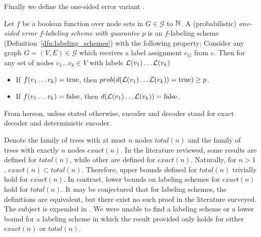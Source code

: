 Finally we define the one-sided error variant  \cite{fraigniaud2009}.

			\begin{definition}\label{dfn:one-sided}
				Let  $f$ be a boolean function over node sets  in  $G \in \mathcal{G}$ to $ \mathbb{N}$.
				 A (probabilistic) \emph{one-sided error $f$-labeling scheme  with guarantee $p$} is an $f$-labeling scheme (Definition~\ref{dfn:labeling_schemes})  with the following property:
				 Consider any graph $G=(V,E) \in \mathcal{G}$ which receives a label assignment $e_G$ from $e$. Then for any set of nodes $v_1\dots v_k\in V$ with labels  $ \mathcal{L}(v_1)\dots  \mathcal{L}(v_k) $
				 \begin{itemize}
				 	\item  If  $f(v_1\dots v_k) =  \mathrm{true} $,  then   $prob(d( \mathcal{L}(v_1)\dots  \mathcal{L}(v_k)) =  \mathrm{true}) \geq p$. 
				 	\item If  $f(v_1\dots v_k) =  \mathrm{false}$, then $d( \mathcal{L}(v_1)\dots  \mathcal{L}(v_k)) =  \mathrm{false}$.    
				 \end{itemize}
			\end{definition}
			
	From hereon, unless stated otherwise, encoder and decoder stand for exact decoder and deterministic encoder. 
		
		Denote the family of trees with at most $n$ nodes $total(n)$ and the family of trees with exactly  $n$ nodes $exact(n)$.
		In the literature reviewed, some  results \cite{Kaplan01,Kannan92} are defined  for $total(n)$,  while other \cite{Alstrup02,Korman07K,gavoille07,Alstrup05} are defined  for $exact(n)$.
		Naturally, for $n>1$, $exact(n) \subset total(n)$.
		Therefore, upper bounds defined for $total(n)$ trivially hold for $exact(n)$.
		In contrast,  lower bounds on labeling schemes for $exact(n)$ hold for $total(n)$.
		It may be conjectured that for labeling schemes, the  definitions are equivalent, but  there exist no such proof in the literature surveyed.
		The subject is expended in \cite{Esben13}. 
		We were unable to find a labeling scheme or a lower bound for a labeling scheme in which the result provided only holds for either $exact(n)$  or $total(n)$. 



 	
